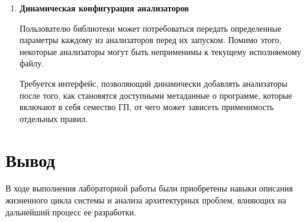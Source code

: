 \documentclass[listings]{labreport}
\begin{document}
\begin{enumerate}
\item \textbf{Динамическая конфигурация анализаторов}

Пользователю библиотеки может потребоваться передать определенные параметры
каждому из анализаторов перед их запуском. Помимо этого, некоторые
анализаторы могут быть неприменимы к текущему исполняемому файлу.

Требуется интерфейс, позволяющий динамически добавлять анализаторы
после того, как становятся доступными метаданные о программе, которые
включают в себя семество ГП, от чего может зависеть применимость отдельных правил.

\end{enumerate}

\section*{Вывод}

В ходе выполнения лабораторной работы были приобретены навыки описания жизненного
цикла системы и анализа архитектурных проблем, влияющих на дальнейший процесс ее
разработки.
\end{document}
